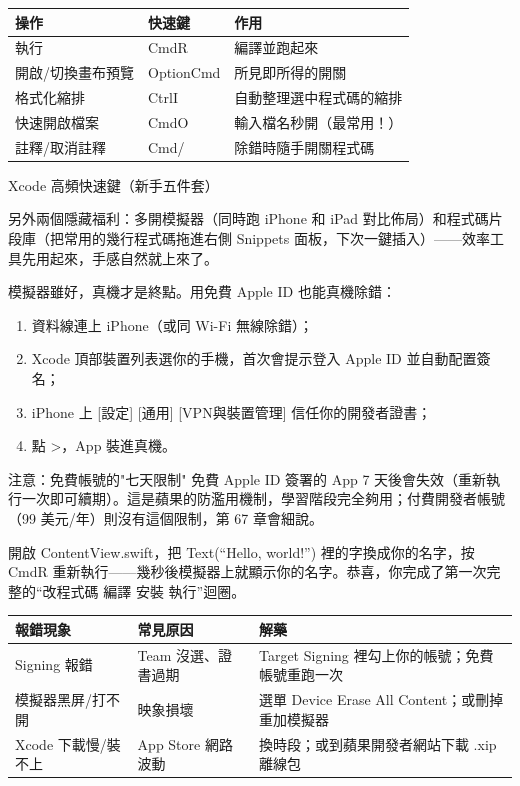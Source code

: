 \begin{center}
\begin{tabularx}{\linewidth}{|X|X|X|}
\hline
\textbf{操作} & \textbf{快速鍵} & \textbf{作用} \tabularnewline
\hline
執行 & CmdR & 編譯並跑起來 \tabularnewline
開啟/切換畫布預覽 & OptionCmd & 所見即所得的開關 \tabularnewline
格式化縮排 & CtrlI & 自動整理選中程式碼的縮排 \tabularnewline
快速開啟檔案 & CmdO & 輸入檔名秒開（最常用！） \tabularnewline
註釋/取消註釋 & Cmd/ & 除錯時隨手開關程式碼 \tabularnewline
\hline
\end{tabularx}
\end{center}

\begin{center}\small\color{gray}Xcode 高頻快速鍵（新手五件套）\end{center}

另外兩個隱藏福利：多開模擬器（同時跑 iPhone 和 iPad 對比佈局）和程式碼片段庫（把常用的幾行程式碼拖進右側 Snippets 面板，下次一鍵插入）——效率工具先用起來，手感自然就上來了。


模擬器雖好，真機才是終點。用免費 Apple ID 也能真機除錯：

\begin{enumerate}
  \item 資料線連上 iPhone（或同 Wi-Fi 無線除錯）；
  \item Xcode 頂部裝置列表選你的手機，首次會提示登入 Apple ID 並自動配置簽名；
  \item iPhone 上 [設定] [通用] [VPN與裝置管理] 信任你的開發者證書；
  \item 點 >，App 裝進真機。
\end{enumerate}

\begin{tcbwarn}{注意：免費帳號的"七天限制"}
免費 Apple ID 簽署的 App 7 天後會失效（重新執行一次即可續期）。這是蘋果的防濫用機制，學習階段完全夠用；付費開發者帳號（99 美元/年）則沒有這個限制，第 67 章會細說。

\end{tcbwarn}



開啟 ContentView.swift，把 Text(“Hello, world!”) 裡的字換成你的名字，按 CmdR 重新執行——幾秒後模擬器上就顯示你的名字。恭喜，你完成了第一次完整的“改程式碼 編譯 安裝 執行”迴圈。

\begin{center}
\begin{tabularx}{\linewidth}{|X|X|X|}
\hline
\textbf{報錯現象} & \textbf{常見原因} & \textbf{解藥} \tabularnewline
\hline
Signing 報錯 & Team 沒選、證書過期 & Target Signing 裡勾上你的帳號；免費帳號重跑一次 \tabularnewline
模擬器黑屏/打不開 & 映象損壞 & 選單 Device Erase All Content；或刪掉重加模擬器 \tabularnewline
Xcode 下載慢/裝不上 & App Store 網路波動 & 換時段；或到蘋果開發者網站下載 .xip 離線包 \tabularnewline
\hline
\end{tabularx}
\end{center}

